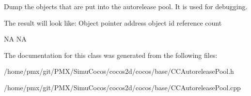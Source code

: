 Dump the objects that are put into the autorelease pool. It is used for debugging.

The result will look like\+: Object pointer address object id reference count

NA  NA 

The documentation for this class was generated from the following files\+:\begin{DoxyCompactItemize}
\item 
/home/pmx/git/\+P\+M\+X/\+Simu\+Cocos/cocos2d/cocos/base/C\+C\+Autorelease\+Pool.\+h\item 
/home/pmx/git/\+P\+M\+X/\+Simu\+Cocos/cocos2d/cocos/base/C\+C\+Autorelease\+Pool.\+cpp\end{DoxyCompactItemize}
